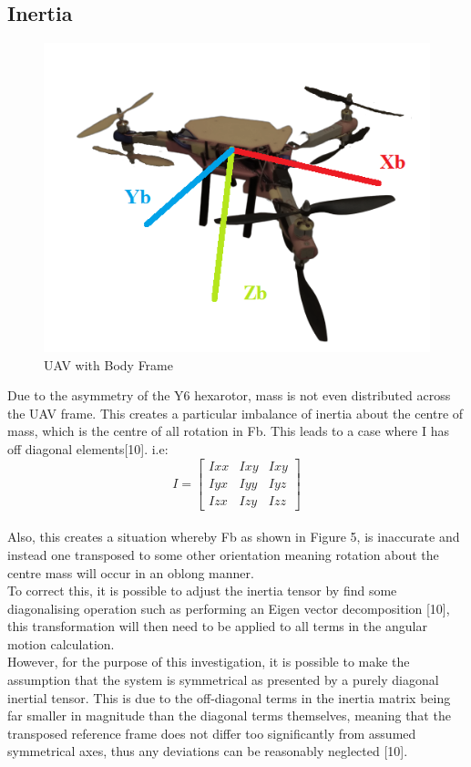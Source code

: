\documentclass[12pt,a4paper,twoside]{report}
\begin{document}
					\subsection*{Inertia}
					
						\begin{figure}[h!]
							\centering
							\includegraphics[width=0.6\linewidth]{UAVBodyFrame.png}
							\caption{UAV with Body Frame}
							\label{fig:uavbodyframe}
						\end{figure}
						 
						Due to the asymmetry of the Y6 hexarotor, mass is not even distributed across the UAV frame. This creates a particular imbalance of inertia about the centre of mass, which is the centre of all rotation in Fb. This leads to a case where I has off diagonal elements[10]. i.e:
						\\
					    $$ 
						 I = 
						 \begin{bmatrix}
							 Ixx & Ixy & Ixy \\
							 Iyx & Iyy & Iyz \\
							 Izx & Izy & Izz
						 \end{bmatrix}
						$$
						 \\
						 Also, this creates a situation whereby Fb as shown in Figure 5, is inaccurate and instead one transposed to some other orientation meaning rotation about the centre mass will occur in an oblong manner.
						 \\
						 To correct this, it is possible to adjust the inertia tensor by find some diagonalising operation such as performing an Eigen vector decomposition [10], this transformation will then need to be applied to all terms in the angular motion calculation.
						 \\  
						 However, for the purpose of this investigation, it is possible to make the assumption that the system is symmetrical as presented by a purely diagonal inertial tensor. This is due to the off-diagonal terms in the inertia matrix being far smaller in magnitude than the diagonal terms themselves, meaning that the transposed reference frame does not differ too significantly from assumed symmetrical axes, thus any deviations can be reasonably neglected [10].
					 
\end{document}
